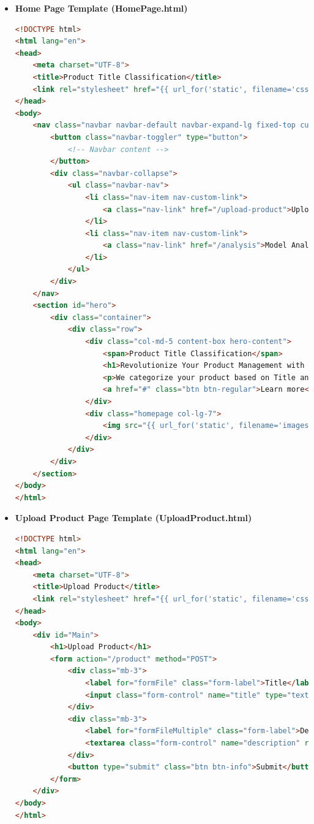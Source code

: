 \documentclass[10pt]{article}
\begin{document}
\begin{itemize}
    \item \textbf{Home Page Template (HomePage.html)}
    \begin{lstlisting}[language=HTML]
<!DOCTYPE html>
<html lang="en">
<head>
    <meta charset="UTF-8">
    <title>Product Title Classification</title>
    <link rel="stylesheet" href="{{ url_for('static', filename='css/style.css') }}">
</head>
<body>
    <nav class="navbar navbar-default navbar-expand-lg fixed-top custom-navbar">
        <button class="navbar-toggler" type="button">
            <!-- Navbar content -->
        </button>
        <div class="navbar-collapse">
            <ul class="navbar-nav">
                <li class="nav-item nav-custom-link">
                    <a class="nav-link" href="/upload-product">Upload Product</a>
                </li>
                <li class="nav-item nav-custom-link">
                    <a class="nav-link" href="/analysis">Model Analysis</a>
                </li>
            </ul>
        </div>
    </nav>
    <section id="hero">
        <div class="container">
            <div class="row">
                <div class="col-md-5 content-box hero-content">
                    <span>Product Title Classification</span>
                    <h1>Revolutionize Your Product Management with Smart Categorization</h1>
                    <p>We categorize your product based on Title and Description</p>
                    <a href="#" class="btn btn-regular">Learn more</a>
                </div>
                <div class="homepage col-lg-7">
                    <img src="{{ url_for('static', filename='images/main-banner.png') }}" class="img-fluid" alt="classification">
                </div>
            </div>
        </div>
    </section>
</body>
</html>
    \end{lstlisting}

    \item \textbf{Upload Product Page Template (UploadProduct.html)}
    \begin{lstlisting}[language=HTML]
<!DOCTYPE html>
<html lang="en">
<head>
    <meta charset="UTF-8">
    <title>Upload Product</title>
    <link rel="stylesheet" href="{{ url_for('static', filename='css/style.css') }}">
</head>
<body>
    <div id="Main">
        <h1>Upload Product</h1>
        <form action="/product" method="POST">
            <div class="mb-3">
                <label for="formFile" class="form-label">Title</label>
                <input class="form-control" name="title" type="text" id="formFile" required placeholder="Enter Product Title"/>
            </div>
            <div class="mb-3">
                <label for="formFileMultiple" class="form-label">Description</label>
                <textarea class="form-control" name="description" rows="10" cols="50" id="formFileMultiple" multiple placeholder="Enter Product Description for more accurate results"></textarea>
            </div>
            <button type="submit" class="btn btn-info">Submit</button>
        </form>
    </div>
</body>
</html>
    \end{lstlisting}


\end{itemize}
\end{document}
